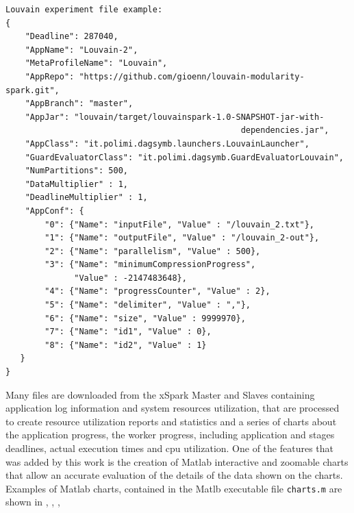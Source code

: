 \begin{verbatim}
Louvain experiment file example:
{
    "Deadline": 287040,
    "AppName": "Louvain-2",
    "MetaProfileName": "Louvain",
    "AppRepo": "https://github.com/gioenn/louvain-modularity-spark.git",
    "AppBranch": "master",
    "AppJar": "louvain/target/louvainspark-1.0-SNAPSHOT-jar-with-
                                                dependencies.jar",
    "AppClass": "it.polimi.dagsymb.launchers.LouvainLauncher",
    "GuardEvaluatorClass": "it.polimi.dagsymb.GuardEvaluatorLouvain",
    "NumPartitions": 500,
    "DataMultiplier" : 1,
    "DeadlineMultiplier" : 1,
    "AppConf": {
        "0": {"Name": "inputFile", "Value" : "/louvain_2.txt"},
        "1": {"Name": "outputFile", "Value" : "/louvain_2-out"},
        "2": {"Name": "parallelism", "Value" : 500},
        "3": {"Name": "minimumCompressionProgress", 
              "Value" : -2147483648},
        "4": {"Name": "progressCounter", "Value" : 2},
        "5": {"Name": "delimiter", "Value" : ","},
        "6": {"Name": "size", "Value" : 9999970},
        "7": {"Name": "id1", "Value" : 0},
        "8": {"Name": "id2", "Value" : 1}      		
   }
}
\end{verbatim}
Many files are downloaded from the xSpark Master and Slaves containing application log information and system resources utilization, that are processed to create resource utilization reports and statistics and a series of charts about the application progress, the worker progress, including application and stages deadlines, actual execution times and cpu utilization. One of the features that was added by this work is the creation of Matlab interactive and zoomable charts that allow an accurate evaluation of the details of the data shown on the charts. Examples of Matlab charts, contained in the Matlb executable file \texttt{charts.m} are shown in , , ,
